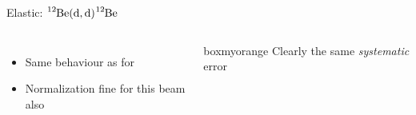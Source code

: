 \documentclass[sans,
frameno, %
mp,
usenames,dvipsnames, %
onlytextwidth, %
t,%
11pt]{beamer}
\newcommand{\iso}[2]{\ce{^{#1}#2}}
\begin{document}
\begin{frame}{Elastic: $\iso{12}{Be}(\textrm{d}, \textrm{d})\iso{12}{Be}$}
{\begin{figure}
\begin{minipage}[t]{0.48\linewidth}
            \end{minipage}
        \end{figure}
        \begin{columns}
            {
                \begin{itemize}
                    \item Same behaviour as for \iso{10}{Be}
                    \item Normalization fine for this beam also
                \end{itemize}
            }\hfill
            {
                \begin{beamercolorbox}[sep=1ex, center, rounded=true]{boxmyorange}
                    Clearly the same \textit{systematic} error
                \end{beamercolorbox}

}
\end{columns}}
\end{frame}
\end{document}

